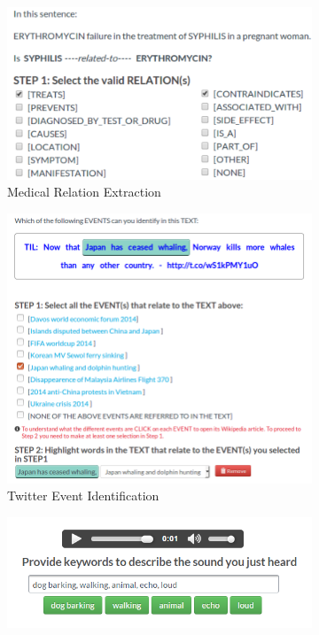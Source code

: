 \begin{figure}[!tb]
\centering
\label{fig:taskdesigns}
\begin{subfigure}{.5\textwidth}
\includegraphics[width=\linewidth]{img/relex}
\caption{Medical Relation Extraction}
\label{fig:screenshot_medical}
\end{subfigure}%
\begin{subfigure}{.5\textwidth}
\includegraphics[width=\linewidth]{img/tweets.png}
\caption{Twitter Event Identification}
\label{fig:screenshot_tweets}
\end{subfigure}
\begin{subfigure}{.5\textwidth}
\includegraphics[width=\linewidth]{img/sound-task.png}

\end{subfigure}
\end{figure}
